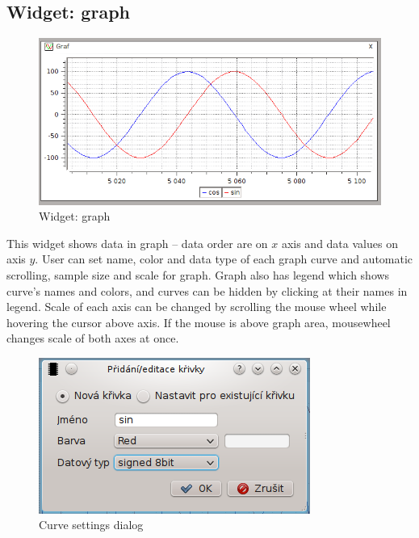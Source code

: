 \documentclass[12pt, a4paper, oneside]{article}
\begin{document}
\subsection{Widget: graph}
\begin{figure}[h]
\begin{center}
\includegraphics[scale=0.65]{img/w_graph.png}
\caption{Widget: graph}
\end{center}
\end{figure}
This widget shows data in graph -- data order are on  $x$ axis and data values on axis $y$. User can set name, color and data type of each graph curve and automatic scrolling, sample size and scale for graph. Graph also has legend which shows curve's names and colors, and curves can be hidden by clicking at their names in legend. Scale of each axis can be changed by scrolling the mouse wheel while hovering the cursor above axis. If the mouse is above graph area, mousewheel changes scale of both axes at once.
\begin{figure}[h]
\begin{center}
\includegraphics[scale=0.8]{img/w_graph_add.png}
\caption{Curve settings dialog}
\end{center}
\end{figure}
\end{document}
